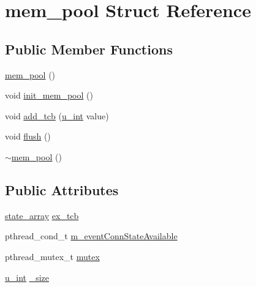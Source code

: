 \hypertarget{structmem__pool}{\section{mem\-\_\-pool \-Struct \-Reference}
\label{structmem__pool}
}
\subsection*{\-Public \-Member \-Functions}
\begin{DoxyCompactItemize}
\item 
\hyperlink{structmem__pool_ac78e24fe178e443e108f1a0bc991bfde}{mem\-\_\-pool} ()
\item 
void \hyperlink{structmem__pool_a60e6ee8be5f13248673b6de69552ed7f}{init\-\_\-mem\-\_\-pool} ()
\item 
void \hyperlink{structmem__pool_ae569ad6133c51ec7bdf1732af56c2e63}{add\-\_\-tcb} (\hyperlink{split__tcp__gateway_8h_ac319c165d52643e43249fe003e18bdf3}{u\-\_\-int} value)
\item 
void \hyperlink{structmem__pool_a4230e869e173004fd8aeb411f8314069}{flush} ()
\item 
\hyperlink{structmem__pool_a3e4bba3dfa1023a06ae0c5867728bca3}{$\sim$mem\-\_\-pool} ()
\end{DoxyCompactItemize}
\subsection*{\-Public \-Attributes}
\begin{DoxyCompactItemize}
\item 
\hyperlink{structstate__array}{state\-\_\-array} \hyperlink{structmem__pool_a85dd96771d2c5329aa4e2b64cee68b0f}{ex\-\_\-tcb}
\item 
pthread\-\_\-cond\-\_\-t \hyperlink{structmem__pool_aff39f70481fdcbb29a2b58e7ffb27acf}{m\-\_\-event\-Conn\-State\-Available}
\item 
pthread\-\_\-mutex\-\_\-t \hyperlink{structmem__pool_a06fca3bdc7d0942a3ea77ad02de743ad}{mutex}
\item 
\hyperlink{split__tcp__gateway_8h_ac319c165d52643e43249fe003e18bdf3}{u\-\_\-int} \hyperlink{structmem__pool_a8845fb60be546e04b56d71ebbbcfe0ce}{\-\_\-size}
\end{DoxyCompactItemize}


